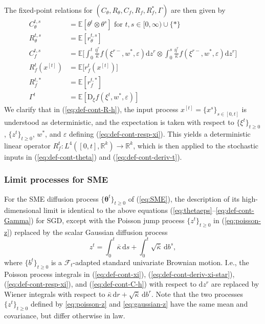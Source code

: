 \documentclass[11pt,letterpaper,reqno]{amsart}
\theoremstyle{definition}
\def\eps{\varepsilon}
\def\d{\mathrm{d}}
\def\D{\mathrm{D}}
\def\E{\mathbb{E}}
\def\R{\mathbb{R}}
\def\cF{\mathcal{F}}
\def\btheta{\boldsymbol{\theta}}
\begin{document}
The fixed-point relations for
$(C_\theta,R_\theta,C_f,R_f,R_f^*,\Gamma)$ are then given by
\begin{align}
C_\theta^{t,s}&=\E[\theta^t \otimes \theta^s] \text{ for } t,s \in [0,\infty)
\cup \{*\}
\label{eq:def-cont-C-t}\\
R_\theta^{t,s}&=\E[r_\theta^{t,s}]
\label{eq:def-cont-R-t}\\
C_f^{t,s}&=\E\Big[\int_0^t \frac{\bar\eta^r}{\bar\kappa}f(\xi^{r-},w^*,\eps)\d z^r
\otimes \int_0^s \frac{\bar\eta^r}{\bar\kappa}f(\xi^{r-},w^*,\eps)\d z^r\Big]\label{eq:def-cont-C-h}\\
R_f^t(x^{[t]})&=\E\big[r_f^t(x^{[t]})\big]\label{eq:def-cont-R-h}\\
R_f^{t,*}&=\E[r_f^{t,*}]
\label{eq:def-cont-R-h-star}\\
\Gamma^t&=\E[\D_\xi f(\xi^t,w^*,\eps)]\label{eq:def-cont-Gamma}
\end{align}
We clarify that in (\ref{eq:def-cont-R-h}), the input process $x^{[t]}=\{x^s\}_{s \in [0,t]}$ is
understood as deterministic, and the expectation is taken with respect to
$\{\xi^t\}_{t \geq 0}$, $\{z^t\}_{t \geq 0}$, $w^*$, and $\eps$ defining
(\ref{eq:def-cont-resp-xi}). This yields a deterministic linear operator
$R_f^t:L^4([0,t],\R^k)\to \R^k$, which is then applied to the stochastic
inputs in (\ref{eq:def-cont-theta}) and (\ref{eq:def-cont-deriv-t}).

\subsubsection{Limit processes for SME}

For the SME diffusion process $\{\btheta^t\}_{t \geq 0}$
of (\ref{eq:SME}), the description of its high-dimensional limit is identical
to the above
equations (\ref{eq:thetaeps}--\ref{eq:def-cont-Gamma}) for SGD, except
with the Poisson jump process $\{z^t\}_{t \geq 0}$ in (\ref{eq:poisson-z})
replaced by the scalar Gaussian diffusion process
\begin{equation}\label{eq:gaussian-z}
z^t=\int_0^t \bar\kappa\,\d s+\int_0^t \sqrt{\bar\kappa}\,\d b^s,
\end{equation}
where $\{b^t\}_{t \geq 0}$ is a $\cF_t$-adapted standard univariate Brownian
motion. I.e., the Poisson process integrals in (\ref{eq:def-cont-xi}),
(\ref{eq:def-cont-deriv-xi-star}), (\ref{eq:def-cont-resp-xi}), and
(\ref{eq:def-cont-C-h}) with respect to $\d z^r$
are replaced by Wiener integrals with respect to
$\bar\kappa\,\d r+\sqrt{\bar\kappa}\,\d b^r$. Note
that the two processes $\{z^t\}_{t \geq 0}$ defined by \eqref{eq:poisson-z}
and \eqref{eq:gaussian-z} have the same mean and covariance, but differ
otherwise in law.
\end{document}
